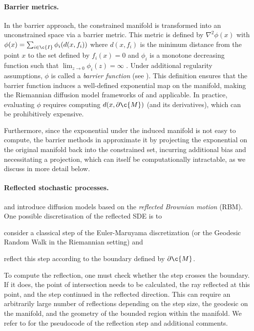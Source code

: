 \paragraph{Barrier metrics.}
In the barrier approach, the constrained manifold is transformed into an unconstrained space via a barrier metric.
This metric is defined by $\nabla^2 \phi(x)$ with $\phi(x) = \sum_{i\in \c{I}} \phi_i(d(x, f_i))$ where \(d(x, f_i)\) is the minimum distance from the point \(x\) to the set defined by \(f_i(x) = 0\) and $\phi_i$ is a monotone decreasing function such that $\lim_{z \rightarrow 0} \phi_i(z) = \infty$ .
Under additional regularity assumptions, $\phi$ is called a \emph{barrier function} (see \cite{nesterov1994interior}).
This definition ensures that the barrier function induces a well-defined exponential map on the manifold, making the Riemannian diffusion model frameworks of \textcite{de2022riemannian} and \textcite{huang2022riemannian} applicable.
In practice, evaluating $\phi$ requires computing \(d(x, \partial \c{M})\) (and its derivatives), which can be prohibitively expensive.

Furthermore, since the exponential under the induced manifold is not easy to compute, the barrier methods in \cite{fishman2023diffusion} approximate it by projecting the exponential on the original manifold back into the constrained set, incurring additional bias and necessitating a projection, which can itself be computationally intractable, as we discuss in more detail below.

\paragraph{Reflected stochastic processes.}
\textcite{lou2023reflected} and \textcite{fishman2023diffusion} introduce diffusion models based on the
\emph{reflected Brownian motion} (RBM).
One possible discretisation of the reflected SDE is to \begin{enumerate*}[label=(\roman*)] \item consider a classical step of the Euler-Maruyama discretization (or the Geodesic Random Walk in the Riemannian setting) and \item reflect this step according to the boundary defined by $\partial \c{M}$.
\end{enumerate*}
To compute the reflection, one must check whether the step crosses the boundary.
If it does, the point of intersection needs to be calculated, the ray reflected at this point, and the step continued in the reflected direction.
This can require an arbitrarily large number of reflections depending on the step size, the geodesic on the manifold, and the geometry of the bounded region within the manifold.
We refer to  for the pseudocode of the reflection step and additional comments.

